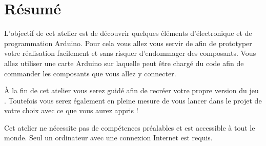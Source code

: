 \section{Résumé}
L'objectif de cet atelier est de découvrir quelques éléments d'électronique et de programmation Arduino.
Pour cela vous allez vous servir de  afin de prototyper votre réalisation facilement et sans risquer d'endommager des composants.
Vous allez utiliser une carte Arduino sur laquelle peut être chargé du code afin de commander les composants que vous allez y connecter.

À la fin de cet atelier vous serez guidé afin de recréer votre propre version du jeu .
Toutefois vous serez également en pleine mesure de vous lancer dans le projet de votre choix avec ce que vous aurez appris !

Cet atelier ne nécessite pas de compétences préalables et est accessible à tout le monde.
Seul un ordinateur avec une connexion Internet est requis.